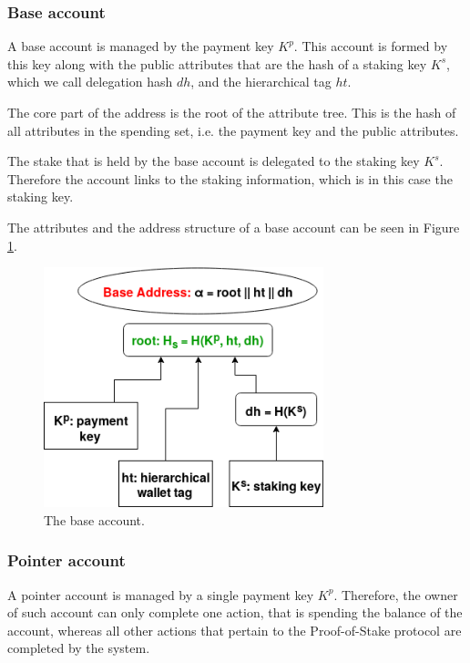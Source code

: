 \subsubsection{Base account}\label{subsubsec:base_account_v2}

A base account is managed by the payment key $K^p$. This account is formed by this key along with the public attributes that are the hash of a staking key $K^s$, which we call delegation hash $dh$, and the hierarchical tag $ht$.

The core part of the address is the root of the attribute tree. This is the hash of all attributes in the spending set, i.e. the payment key and the public attributes.

The stake that is held by the base account is delegated to the staking key $K^s$. Therefore the account links to the staking information, which is in this case the staking key.

The attributes and the address structure of a base account can be seen in Figure \ref{fig:base_account_v2}.

\begin{figure}
  \begin{center}
    \includegraphics[width=230pt]{base_account_v2.png}
  \end{center}
  \caption{The base account.}
  \label{fig:base_account_v2}
\end{figure}

\subsubsection{Pointer account}\label{subsubsec:pointer_account}

A pointer account is managed by a single payment key $K^p$. Therefore, the owner of such account can only complete one action, that is spending the balance of the account, whereas all other actions that pertain to the Proof-of-Stake protocol are completed by the system.

